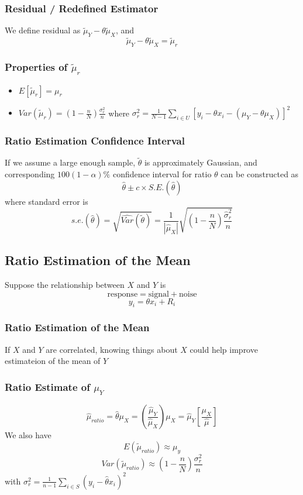 \documentclass[11pt]{article}
\begin{document}
\subsubsection{Residual / Redefined Estimator}
We define residual as $\tilde{\mu}_Y-\theta\tilde{\mu}_X$, and 
\[\tilde{\mu}_Y-\theta\tilde{\mu}_X=\tilde{\mu}_r\]
\subsubsection{Properties of $\tilde{\mu}_r$}
\begin{itemize}
    \item $E[\tilde{\mu}_r]=\mu_r$
    \item $Var(\tilde{\mu}_r) = (1-\frac{n}{N})\frac{\sigma^2_r}{n}$ where $\sigma^2_r=\frac{1}{N-1}\sum_{i\in U}[y_i-\theta x_i-(\mu_Y-\theta\mu_X)]^2$
\end{itemize}
\subsubsection{Ratio Estimation Confidence Interval}
If we assume a large enough sample, $\tilde{\theta}$ is approximately Gaussian, and corresponding 
$100(1-\alpha)\%$ confidence interval for ratio $\theta$ can be constructed as 
\[\hat{\theta}\pm c\times S.E.(\hat{\theta})\]
where standard error is 
\[s.e.(\hat{\theta})=\sqrt{\hat{Var}(\tilde{\theta})} = \frac{1}{|\hat{\mu}_X|}\sqrt{(1-\frac{n}{N})\frac{\hat{\sigma}^2_r}{n}}\]
\subsection{Ratio Estimation of the Mean}
Suppose the relationship between $X$ and $Y$ is 
\[\text{response}=\text{signal}+\text{noise}\]
\[y_i=\theta x_i+R_i\]
\subsubsection{Ratio Estimation of the Mean}
If $X$ and $Y$ are correlated, knowing things about $X$ could help improve estimateion of the mean of $Y$ 
\subsubsection{Ratio Estimate of $\mu_Y$}
\[\hat{\mu}_{ratio}=\hat{\theta}\mu_X=(\frac{\hat{\mu}_Y}{\hat{\mu}_X})\mu_X = \hat{\mu}_Y[\frac{\mu_X}{\hat{\mu}}]\]
We also have 
\[E(\tilde{\mu}_{ratio}) \approx \mu_y\]
\[Var(\tilde{\mu}_{ratio}) \approx (1-\frac{n}{N})\frac{\sigma^2_r}{n}\]
with $\sigma^2_r = \frac{1}{n-1}\sum_{i\in S}(y_i-\hat{\theta}x_i)^2$
\end{document}
